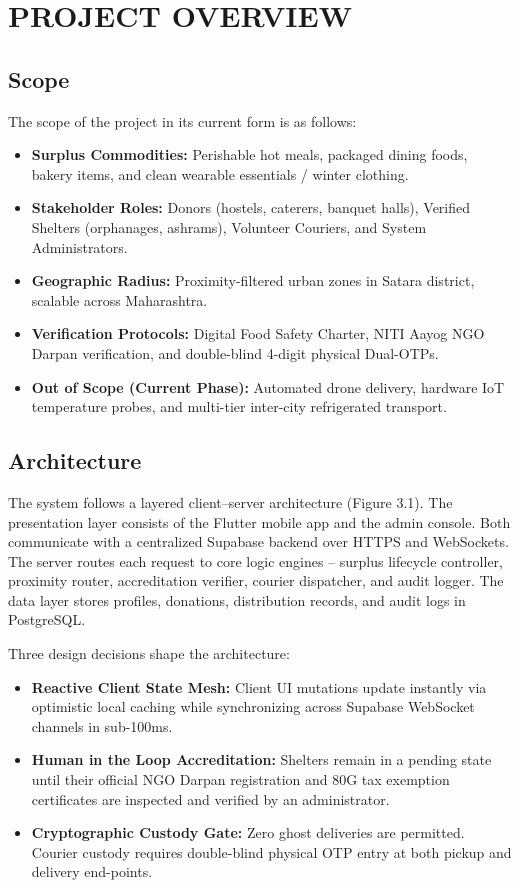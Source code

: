 \documentclass[12pt,a4paper]{article}
\begin{document}
\section{PROJECT OVERVIEW}

\subsection{Scope}
The scope of the project in its current form is as follows:
\begin{itemize}
    \item \textbf{Surplus Commodities:} Perishable hot meals, packaged dining foods, bakery items, and clean wearable essentials / winter clothing.
    \item \textbf{Stakeholder Roles:} Donors (hostels, caterers, banquet halls), Verified Shelters (orphanages, ashrams), Volunteer Couriers, and System Administrators.
    \item \textbf{Geographic Radius:} Proximity-filtered urban zones in Satara district, scalable across Maharashtra.
    \item \textbf{Verification Protocols:} Digital Food Safety Charter, NITI Aayog NGO Darpan verification, and double-blind 4-digit physical Dual-OTPs.
    \item \textbf{Out of Scope (Current Phase):} Automated drone delivery, hardware IoT temperature probes, and multi-tier inter-city refrigerated transport.
\end{itemize}

\subsection{Architecture}
The system follows a layered client--server architecture (Figure 3.1). The presentation layer consists of the Flutter mobile app and the admin console. Both communicate with a centralized Supabase backend over HTTPS and WebSockets. The server routes each request to core logic engines -- surplus lifecycle controller, proximity router, accreditation verifier, courier dispatcher, and audit logger. The data layer stores profiles, donations, distribution records, and audit logs in PostgreSQL.

Three design decisions shape the architecture:
\begin{itemize}
    \item \textbf{Reactive Client State Mesh:} Client UI mutations update instantly via optimistic local caching while synchronizing across Supabase WebSocket channels in sub-100ms.
    \item \textbf{Human in the Loop Accreditation:} Shelters remain in a pending state until their official NGO Darpan registration and 80G tax exemption certificates are inspected and verified by an administrator.
    \item \textbf{Cryptographic Custody Gate:} Zero ghost deliveries are permitted. Courier custody requires double-blind physical OTP entry at both pickup and delivery end-points.
\end{itemize}
\end{document}
